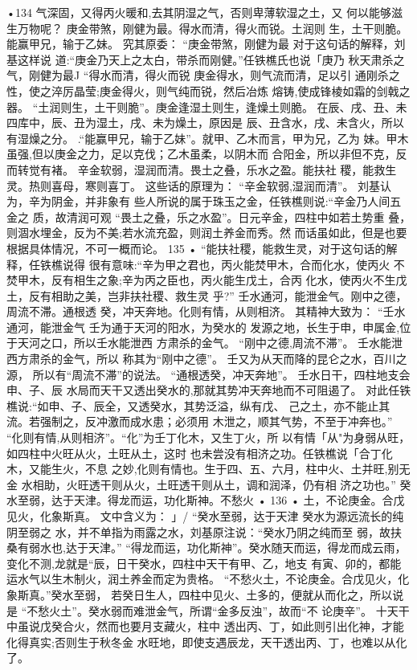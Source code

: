 •134
气深固，又得丙火暖和,去其阴湿之气，否则卑薄软湿之土，又
何以能够滋生万物呢？
庚金带煞，刚健为最。得水而清，得火而锐。土润则
生，土干则脆。能赢甲兄，输于乙妹。
究其原委：
“庚金带煞，刚健为最 对于这句话的解释，刘基这样说
道:“庚金乃天上之太白，带杀而刚健。”任铁樵氏也说「庚乃
秋天肃杀之气，刚健为最J
“得水而清，得火而锐 庚金得水，则气流而清，足以引
通刚杀之性，使之淬厉晶莹;庚金得火，则气纯而锐，然后冶炼
熔铸,使成锋棱如霜的剑戟之器。
“土润则生，土干则脆”。庚金逢湿土则生，逢燥土则脆。
在辰、戌、丑、未四库中，辰、丑为湿土，戌、未为燥土，原因是
辰、丑含水，戌、未含火，所以有湿燥之分。
.“能赢甲兄，输于乙妹”。就甲、乙木而言，甲为兄，乙为
妹。甲木虽强,但以庚金之力，足以克伐；乙木虽柔，以阴木而
合阳金，所以非但不克，反而转觉有褚。
辛金软弱，湿润而清。畏土之叠，乐水之盈。能扶社
稷，能救生灵。热则喜母，寒则喜丁。
这些话的原理为：
“辛金软弱,湿润而清”。 刘基认为，辛为阴金，并非象有
些人所说的属于珠玉之金，任铁樵则说:“辛金乃人间五金之
质，故清润可观
“畏土之叠，乐之水盈”。日元辛金，四柱中如若土势重
叠，则涸水埋金，反为不美;若水流充盈，则润土养金而秀。然
而话虽如此，但是也要根据具体情况，不可一概而论。
135 •
“能扶社稷，能救生灵，对于这句话的解释，任铁樵说得
很有意味:“辛为甲之君也，丙火能焚甲木，合而化水，使丙火
不焚甲木，反有相生之象;辛为丙之臣也，丙火能生戊土，合丙
化水，使丙火不生戊土，反有相助之美，岂非扶社稷、救生灵
乎?”
壬水通河，能泄金气。刚中之德，周流不滞。通根透
癸，冲天奔地。化则有情，从则相济。
其精神大致为：
“壬水通河，能泄金气 壬为通于天河的阳水，为癸水的
发源之地，长生于申，申属金,位于天河之口，所以壬水能泄西
方肃杀的金气。
“刚中之德,周流不滞”。 壬水能泄西方肃杀的金气，所以
称其为“刚中之德”。 壬又为从天而降的昆仑之水，百川之源，
所以有“周流不滞”的说法。
“通根透癸，冲天奔地”。 壬水日干，四柱地支会申、子、辰
水局而天干又透出癸水的,那就其势冲天奔地而不可阻遏了。
对此任铁樵说:“如申、子、辰全，又透癸水，其势泛溢，纵有戊、
己之土，亦不能止其流。若强制之，反冲激而成水患；必须用
木泄之，顺其气势，不至于冲奔也。”
“化则有情,从则相济”。“化”为壬丁化木，又生丁火，所
以有情「从"为身弱从旺，如四柱中火旺从火，土旺从土，这时
也未尝没有相济之功。任铁樵说「合丁化木，又能生火，不息
之妙,化则有情也。生于四、五、六月，柱中火、土并旺,别无金
水相助，火旺透干则从火，土旺透干则从土，调和润泽，仍有相
济之功也。”
癸水至弱，达于天津。得龙而运，功化斯神。不愁火
• 136 •
土，不论庚金。合戊见火，化象斯真。
文中含义为： 」/
“癸水至弱，达于天津 癸水为源远流长的纯阴至弱之
水，并不单指为雨露之水，刘基原注说：“癸水乃阴之纯而至
弱，故扶桑有弱水也,达于天津。”
“得龙而运，功化斯神”。癸水随天而运，得龙而成云雨，
变化不测,龙就是“辰，日干癸水，四柱中天干有甲、乙，地支
有寅、卯的，都能运水气以生木制火，润土养金而定为贵格。
“不愁火土，不论庚金。合戊见火，化象斯真。”癸水至弱，
若癸日生人，四柱中见火、土多的，便就从而化之，所以说是
“不愁火土”。癸水弱而难泄金气，所谓“金多反浊”，故而“不
论庚辛”。 十天干中虽说戊癸合火，然而也要月支藏火，柱中
透出丙、丁，如此则引出化神，才能化得真实;否则生于秋冬金
水旺地，即使支遇辰龙，天干透出丙、丁，也难以从化了。

